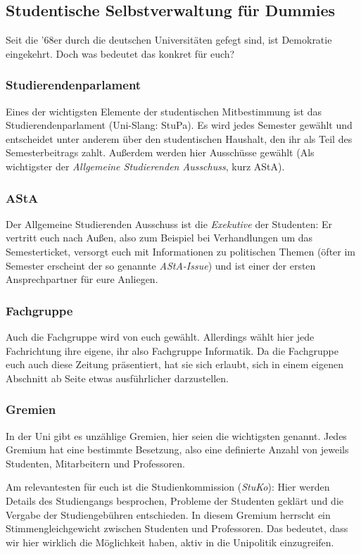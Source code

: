 \begin{multicols}{2}
	\subsection*{Studentische Selbstverwaltung für Dummies}
		Seit die '68er durch die deutschen Universitäten gefegt sind, ist Demokratie eingekehrt. Doch was bedeutet das konkret für euch?

	\subsubsection*{Studierendenparlament}
		Eines der wichtigsten Elemente der studentischen Mitbestimmung ist das Studierendenparlament (Uni-Slang: StuPa). Es wird jedes Semester gewählt und entscheidet unter anderem über den studentischen Haushalt, den ihr als Teil des Semesterbeitrags zahlt. Außerdem werden hier Ausschüsse gewählt (Als wichtigster der \emph{Allgemeine Studierenden Ausschuss}, kurz AStA).

	\subsubsection*{AStA}
		Der Allgemeine Studierenden Ausschuss ist die \emph{Exekutive} der Studenten: Er vertritt euch nach Außen, also zum Beispiel bei Verhandlungen um das Semesterticket, versorgt euch mit Informationen zu politischen Themen (öfter im Semester erscheint der so genannte \emph{AStA-Issue}) und ist einer der ersten Ansprechpartner für eure Anliegen.

	\subsubsection*{Fachgruppe}
		Auch die Fachgruppe wird von euch gewählt. Allerdings wählt hier jede Fachrichtung ihre eigene, ihr also Fachgruppe Informatik. Da die Fachgruppe euch auch diese Zeitung präsentiert, hat sie sich erlaubt, sich in einem eigenen Abschnitt ab Seite \pageref{fachgruppe} etwas ausführlicher darzustellen.

	\subsubsection*{Gremien}
		In der Uni gibt es unzählige Gremien, hier seien die wichtigsten genannt. Jedes Gremium hat eine bestimmte Besetzung, also eine definierte Anzahl von jeweils Studenten, Mitarbeitern und Professoren.

		Am relevantesten für euch ist die Studienkommission (\emph{StuKo}): Hier werden Details des Studiengangs besprochen, Probleme der Studenten geklärt und die Vergabe der Studiengebühren entschieden. In diesem Gremium herrscht ein Stimmengleichgewicht zwischen Studenten und Professoren. Das bedeutet, dass wir hier wirklich die Möglichkeit haben, aktiv in die Unipolitik einzugreifen.


\end{multicols}
